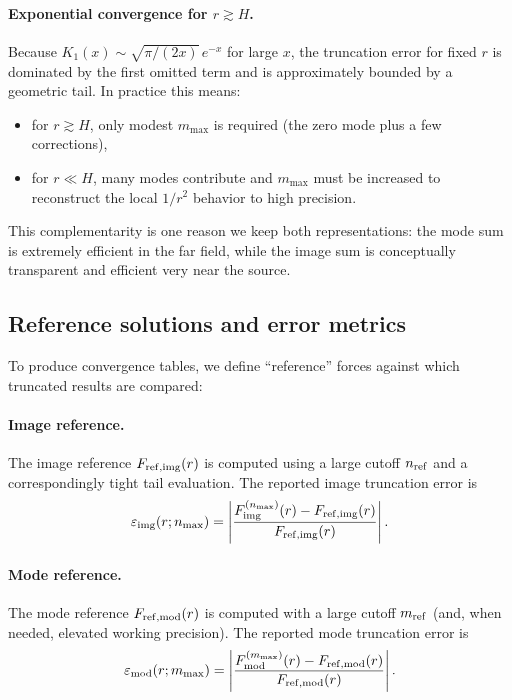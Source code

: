 \documentclass[11pt]{article}
\begin{document}
\paragraph{Exponential convergence for $r\gtrsim H$.}
Because $K_1(x)\sim \sqrt{\pi/(2x)}\,e^{-x}$ for large $x$, the truncation error for fixed $r$ is
dominated by the first omitted term and is approximately bounded by a geometric tail.
In practice this means:
\begin{itemize}
  \item for $r\gtrsim H$, only modest $m_{\max}$ is required (the zero mode plus a few corrections),
  \item for $r\ll H$, many modes contribute and $m_{\max}$ must be increased to reconstruct the local
        $1/r^2$ behavior to high precision.
\end{itemize}
This complementarity is one reason we keep both representations: the mode sum is extremely efficient
in the far field, while the image sum is conceptually transparent and efficient very near the source.

\subsection{Reference solutions and error metrics}

To produce convergence tables, we define ``reference'' forces against which truncated results are
compared:

\paragraph{Image reference.}
The image reference $F_{\rm ref,img}(r)$ is computed using a large cutoff $n_{\rm ref}$ and a
correspondingly tight tail evaluation.  The reported image truncation error is
\begin{equation}
  \varepsilon_{\rm img}(r;n_{\max})
  = \left|\frac{F_{\rm img}^{(n_{\max})}(r)-F_{\rm ref,img}(r)}{F_{\rm ref,img}(r)}\right|.
\end{equation}

\paragraph{Mode reference.}
The mode reference $F_{\rm ref,mod}(r)$ is computed with a large cutoff $m_{\rm ref}$ (and, when
needed, elevated working precision).  The reported mode truncation error is
\begin{equation}
  \varepsilon_{\rm mod}(r;m_{\max})
  = \left|\frac{F_{\rm mod}^{(m_{\max})}(r)-F_{\rm ref,mod}(r)}{F_{\rm ref,mod}(r)}\right|.
\end{equation}
\end{document}
